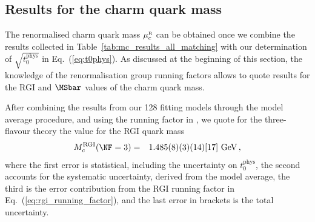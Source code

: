 \subsection{Results for the charm quark mass}

The renormalised charm quark mass 
$\mu_c^{\rm\scriptscriptstyle R}$ can be obtained once we combine the results collected in Table~\ref{tab:mc_results_all_matching} with our determination of $\sqrt{t_0^{\mathrm{phys}}}$ in Eq.~(\ref{eq:t0phys}). As discussed at the beginning of this section, the knowledge of the renormalisation group running factors allows  to quote
results for the RGI and $\MSbar$ values of the charm quark mass.

After combining the results from our 128 fitting models through the model average procedure,
and using the running factor in , we quote for the three-flavour theory
the value for the RGI quark mass
\begin{eqnarray}
  M_c^{\mathrm{RGI}}(\NF=3) &=& 1.485(8)(3)(14)[17]\ \mathrm{GeV}\,,
	\label{eq:rgi_charm_mass_result}
\end{eqnarray}
where the first error is statistical, including the uncertainty on  $t_0^{\mathrm{phys}}$,  the second accounts for the systematic uncertainty, derived from the model average, the third is the error contribution from the RGI running factor in Eq.~(\ref{eq:rgi_running_factor}), and the last error in brackets is the total uncertainty. 

